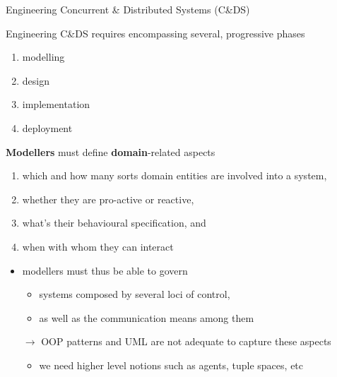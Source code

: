 \documentclass[presentation]{beamer}\mode<presentation>{\usetheme{AMSCesenaPurpleAndGold}}
\begin{document}
\begin{frame}[c,allowframebreaks]{Engineering Concurrent \& Distributed Systems (C\&DS)}

	Engineering C\&DS requires encompassing several, progressive phases
	\begin{enumerate}
		\item modelling
		\item design
		\item implementation
		\item deployment
	\end{enumerate}

	\framebreak

	\begin{block}{\textbf{Modellers} must define \textbf{domain}-related aspects}
		\begin{enumerate}
			\item which and how many sorts \alert{domain entities} are involved into a system,
			\item whether they are \alert{pro-active} or \alert{reactive},
			\item what's their \alert{behavioural specification}, and
			\item when with whom they can \alert{interact}
		\end{enumerate}
	\end{block}

	\bigskip

	\begin{itemize}
		\item modellers must thus be able to govern
		\begin{itemize}
			\item systems composed by several \alert{loci of control},
			\item as well as the \alert{communication means} among them
		\end{itemize}

		\bigskip

		\item[$\rightarrow$] OOP patterns and UML are not adequate to capture these aspects
		\begin{itemize}
			\item we need higher level notions such as \alert{agents}, \alert{tuple spaces}, etc
		\end{itemize}
	\end{itemize}

	\framebreak


\end{frame}
\end{document}
